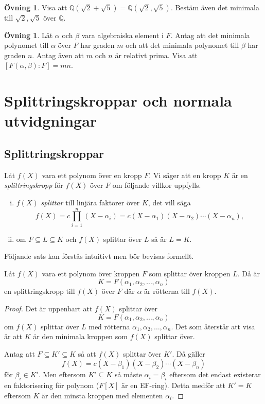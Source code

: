 \documentclass{article}
\theoremstyle{definition}
\newtheorem{ovning}[thm]{Övning}
\begin{document}
\begin{ovning}
  Visa att $\mathbb{Q}(\sqrt{2} + \sqrt{5}) = \mathbb{Q}(\sqrt{2}, \sqrt{5})$. Bestäm även det minimala till $\sqrt{2}, \sqrt{5}$ över $\mathbb{Q}$.
\end{ovning}

\begin{ovning}
  Låt $\alpha$ och $\beta$ vara algebraiska element i $F$. Antag att det minimala polynomet till $\alpha$ över $F$ har 
  graden $m$ och att det minimala polynomet till $\beta$ har graden $n$. Antag även att $m$ och $n$ är relativt prima. 
  Visa att $[F(\alpha, \beta): F] = mn$.
\end{ovning}

\section{Splittringskroppar och normala utvidgningar}
\subsection{Splittringskroppar}
\begin{mydef}{}{}
  Låt $f(X)$ vara ett polynom över en kropp $F$. Vi säger att en kropp $K$ är en \textit{splittringskropp} för $f(X)$ över $F$ om följande villkor uppfylls. 
  \begin{enumerate}[(i)]
    \item $f(X)$ \textit{splittar} till linjära faktorer över $K$, det vill säga 
    \[f(X) = c \prod_{i=1}^n (X- \alpha_i) = c(X-\alpha_1)(X-\alpha_2)\cdots (X-\alpha_n),\]
    \item om $F \subseteq L \subseteq K$ och $f(X)$ splittar över $L$ så är $L = K.$
  \end{enumerate}
\end{mydef}
Följande sats kan förstås intuitivt men bör bevisas formellt.
\hypertarget{lemma6.0.1}{}
\begin{mylemma}{}{}
  Låt $f(X)$ vara ett polynom över kroppen $F$ som splittar över kroppen $L$. Då är 
  \[K = F(\alpha_1, \alpha_2, \ldots, \alpha_n)\]
  en splittringskropp till $f(X)$ över $F$ där $\alpha$ är rötterna till $f(X)$.
\end{mylemma}

\begin{proof}
  Det är uppenbart att $f(X)$ splittar över 
  \[K = F(\alpha_1, \alpha_2, \ldots, \alpha_n)\]
  om $f(X)$ splittar över $L$ med rötterna $\alpha_1, \alpha_2, \ldots, \alpha_n$. Det som återstår att visa är att 
  $K$ är den minimala kroppen som $f(X)$ splittar över. 

  Antag att $F \subseteq K' \subseteq K$ så att $f(X)$ splittar över $K'$. Då gäller 
  \[f(X) = c(X- \beta_1)(X - \beta_2)\cdots (X - \beta_n)\]
  för $\beta_i \in K'.$ 
  Men eftersom $K' \subseteq K$ så måste $\alpha_i = \beta_i$ eftersom det endast existerar en faktorisering för polynom ($F[X]$ är en EF-ring). 
  Detta medför att $K' = K$ eftersom $K$ är den minsta kroppen med elementen $\alpha_i$.
\end{proof}
\end{document}
